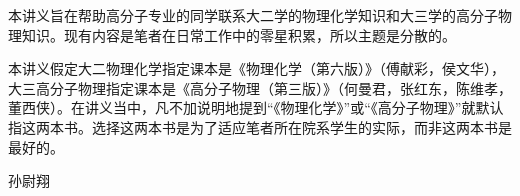 \documentclass[main.tex]{subfiles}
\begin{document}
本讲义旨在帮助高分子专业的同学联系大二学的物理化学知识和大三学的高分子物理知识。现有内容是笔者在日常工作中的零星积累，所以主题是分散的。

本讲义假定大二物理化学指定课本是《物理化学（第六版）》（傅献彩，侯文华），大三高分子物理指定课本是《高分子物理（第三版）》（何曼君，张红东，陈维孝，董西侠）。在讲义当中，凡不加说明地提到“《物理化学》”或“《高分子物理》”就默认指这两本书。选择这两本书是为了适应笔者所在院系学生的实际，而非这两本书是最好的。

\begin{flushright}
  孙尉翔\\
  \YearMonth
\end{flushright}
\end{document}
